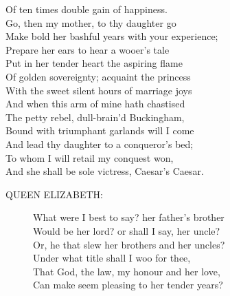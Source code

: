 \documentclass{article}
\begin{document}
\begin{description}
\hspace{1pt}Of ten times double gain of happiness.\\
\hspace{1pt}Go, then my mother, to thy daughter go\\
\hspace{1pt}Make bold her bashful years with your experience;\\
\hspace{1pt}Prepare her ears to hear a wooer's tale\\
\hspace{1pt}Put in her tender heart the aspiring flame\\
\hspace{1pt}Of golden sovereignty; acquaint the princess\\
\hspace{1pt}With the sweet silent hours of marriage joys\\
\hspace{1pt}And when this arm of mine hath chastised\\
\hspace{1pt}The petty rebel, dull-brain'd Buckingham,\\
\hspace{1pt}Bound with triumphant garlands will I come\\
\hspace{1pt}And lead thy daughter to a conqueror's bed;\\
\hspace{1pt}To whom I will retail my conquest won,\\
\hspace{1pt}And she shall be sole victress, Caesar's Caesar.\\
\end{description}
\begin{description}
\item[QUEEN ELIZABETH:] 
\hspace{1pt}What were I best to say? her father's brother\\
\hspace{1pt}Would be her lord? or shall I say, her uncle?\\
\hspace{1pt}Or, he that slew her brothers and her uncles?\\
\hspace{1pt}Under what title shall I woo for thee,\\
\hspace{1pt}That God, the law, my honour and her love,\\
\hspace{1pt}Can make seem pleasing to her tender years?\\
\end{description}
\end{document}
